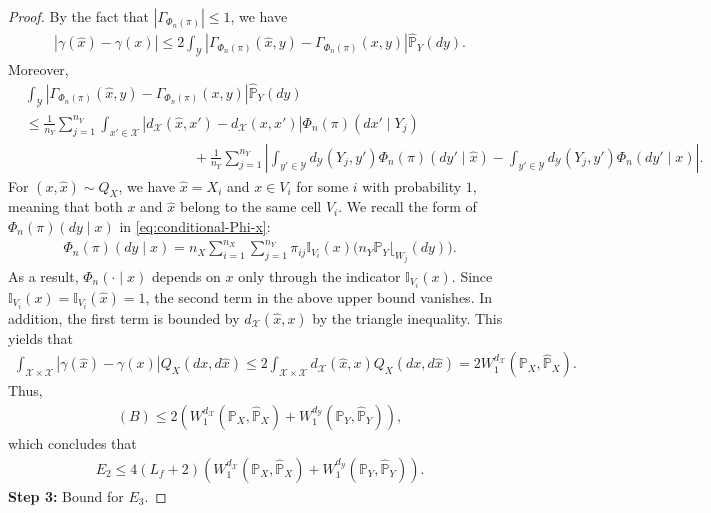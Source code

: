 \documentclass{article}
\theoremstyle{plain}
\theoremstyle{definition}
\theoremstyle{remark}
\begin{document}
\begin{proof}
	By the fact that $| \Gamma_{\Phi_n(\pi)} | \leq 1$, we have
	\begin{align*}
		| \gamma(\hat{x}) - \gamma(x) | \leq 2\int_{\mathcal{Y}} \left\vert \Gamma_{\Phi_n(\pi)}(\hat{x},y) - \Gamma_{\Phi_n(\pi)}(x,y) \right\vert \hat{\mathbb{P}}_Y(dy) .
	\end{align*}
	Moreover,
	\begin{align*}
		&\int_{\mathcal{Y}} \left\vert \Gamma_{\Phi_n(\pi)}(\hat{x},y) - \Gamma_{\Phi_n(\pi)}(x,y) \right\vert \hat{\mathbb{P}}_Y(dy) \\
		&\leq \frac{1}{n_Y}\sum_{j=1}^{n_Y} \int_{x' \in \mathcal{X}} | d_{\mathcal{X}}(\hat{x},x') - d_{\mathcal{X}}(x,x') | \Phi_n(\pi)(dx' \mid Y_j) \\
		&\qquad\qquad\qquad\qquad\qquad\qquad + \frac{1}{n_Y}\sum_{j=1}^{n_Y} \left\vert \int_{y' \in \mathcal{Y}} d_{\mathcal{Y}}(Y_j,y') \Phi_n(\pi)(dy' \mid \hat{x}) - \int_{y' \in \mathcal{Y}} d_{\mathcal{Y}}(Y_j,y') \Phi_n(dy' \mid x) \right\vert .
	\end{align*}
	For $(x,\hat{x}) \sim Q_X$, we have $\hat{x} = X_i$ and $x \in V_i$ for some $i$ with probability $1$, meaning that both $x$ and $\hat{x}$ belong to the same cell $V_i$. We recall the form of $\Phi_n(\pi)(dy \mid x)$ in \eqref{eq:conditional-Phi-x}:
	\begin{align*}
		\Phi_n(\pi)(dy \mid x) = n_X \sum_{i=1}^{n_X}\sum_{j=1}^{n_Y} \pi_{ij}\mathbb{I}_{V_i}(x) \Big(n_Y \mathbb{P}_Y\lfloor_{W_j} (dy)\Big) .
	\end{align*}
	As a result, $\Phi_n(\cdot \mid x)$ depends on $x$ only through the indicator $\mathbb{I}_{V_i}(x)$. Since $\mathbb{I}_{V_i}(x) = \mathbb{I}_{V_i}(\hat{x}) = 1$, the second term in the above upper bound vanishes. In addition, the first term is bounded by $d_{\mathcal{X}}(\hat{x},x)$ by the triangle inequality. This yields that
	\begin{align*}
		\int_{\mathcal{X} \times \mathcal{X}} \left\vert \gamma(\hat{x}) - \gamma(x) \right\vert Q_X(dx,d\hat{x}) \leq 2\int_{\mathcal{X} \times \mathcal{X}} d_{\mathcal{X}}(\hat{x},x) Q_X(dx,d\hat{x}) = 2W_1^{d_{\mathcal{X}}}(\mathbb{P}_X,\hat{\mathbb{P}}_X) .
	\end{align*}
	Thus,
	\begin{align*}
		(B) \leq 2\left(W_1^{d_{\mathcal{X}}}(\mathbb{P}_X,\hat{\mathbb{P}}_X) + W_1^{d_{\mathcal{Y}}}(\mathbb{P}_Y,\hat{\mathbb{P}}_Y)\right) ,
	\end{align*}
	which concludes that
	\begin{align}
		\label{eq:E2}
		E_2 \leq 4(L_f + 2)(W_1^{d_{\mathcal{X}}}(\mathbb{P}_X,\hat{\mathbb{P}}_X) + W_1^{d_{\mathcal{Y}}}(\mathbb{P}_Y,\hat{\mathbb{P}}_Y)) .
	\end{align}
 	{\large\textbf{Step 3:} Bound for $E_3$.}


\end{proof}
\end{document}
